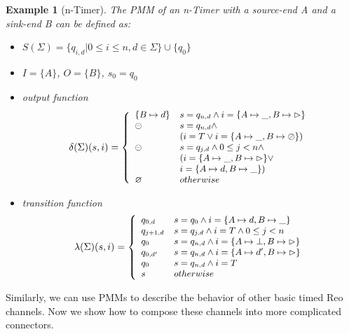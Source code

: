 \documentclass[conference, a4paper]{IEEEtran}
\newtheorem{example}{Example}
\newcommand{\rblock}[0]{\circleddash}
\newcommand{\rread}[0]{\rhd}
\newcommand{\rnoread}[0]{\oslash}
\newcommand{\rempty}[0]{\varnothing}
\begin{document}
\begin{example}[n-Timer]
  The PMM of an n-Timer with a source-end A and a sink-end B can be defined as:
  \begin{itemize}
    \item[-] $S(\Sigma)=\{q_{i,d}|0\leq i\leq n, d\in \Sigma\}\cup\{q_0\}$
    \item[-] $I=\{A\}$, $O=\{B\}$, $s_0=q_0$
    \item[-] output function
      \begin{displaymath}
        \small
        \delta(\Sigma)(s,i)=\left\{
        \begin{array}[ht]{ll}
          \{B\mapsto d\} & s=q_{n,d}\land i=\{A\mapsto \_,B\mapsto \rread\}\\
          \rblock & s=q_{n,d}\land \\
          & (i=T\lor i=\{A\mapsto \_,B\mapsto \rnoread\}) \\
          \rblock & s=q_{j,d}\land 0 \leq j < n\land \\
          & (i=\{A\mapsto \_,B\mapsto \rread\}\lor \\
          & i=\{A\mapsto d,B\mapsto \_\})\\
          \rempty & otherwise\\
        \end{array}
        \right.
      \end{displaymath} 
    \item[-] transition function
      \begin{displaymath}
        \small
        \lambda(\Sigma)(s,i)=\left\{
        \begin{array}[ht]{ll}
          q_{0,d} & s=q_0 \land i=\{A\mapsto d,B\mapsto \_\} \\
          q_{j+1,d} & s=q_{j,d}\land i=T\land0 \leq j < n\\
          q_0 & s=q_{n,d}\land i=\{A\mapsto \bot,B\mapsto \rread\} \\
          q_{0,d'} & s=q_{n,d}\land i=\{A\mapsto d',B\mapsto \rread\} \\
          q_0 & s=q_{n,d} \land i=T \\
          s & otherwise \\
        \end{array}
        \right.
      \end{displaymath}
  \end{itemize}
\end{example}

Similarly, we can use PMMs to describe the behavior of other basic timed Reo
channels. Now we show how to compose these channels into more complicated connectors.
\end{document}
